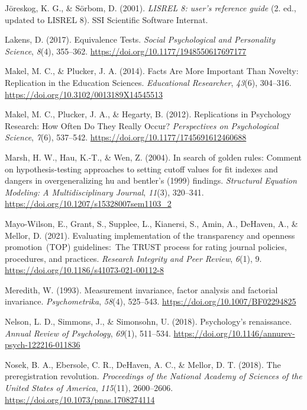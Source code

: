 \documentclass[
  man]{apa7}
\newlength{\cslhangindent}
\newenvironment{CSLReferences}[2] %
 {\begin{list}{}{%
  \setlength{\itemindent}{0pt}
  \setlength{\leftmargin}{0pt}
  \setlength{\parsep}{0pt}
  \ifodd #1
   \setlength{\leftmargin}{\cslhangindent}
   \setlength{\itemindent}{-1\cslhangindent}
  \fi
  \setlength{\itemsep}{#2\baselineskip}}}
 {\end{list}}
\begin{document}
\begin{CSLReferences}{1}{0}
Jöreskog, K. G., \& Sörbom, D. (2001). \emph{LISREL 8: user's reference guide} (2. ed., updated to LISREL 8). SSI Scientific Software Internat.

Lakens, D. (2017). Equivalence Tests. \emph{Social Psychological and Personality Science}, \emph{8}(4), 355--362. \url{https://doi.org/10.1177/1948550617697177}

Makel, M. C., \& Plucker, J. A. (2014). Facts Are More Important Than Novelty: Replication in the Education Sciences. \emph{Educational Researcher}, \emph{43}(6), 304--316. \url{https://doi.org/10.3102/0013189X14545513}

Makel, M. C., Plucker, J. A., \& Hegarty, B. (2012). Replications in Psychology Research: How Often Do They Really Occur? \emph{Perspectives on Psychological Science}, \emph{7}(6), 537--542. \url{https://doi.org/10.1177/1745691612460688}

Marsh, H. W., Hau, K.-T., \& Wen, Z. (2004). In search of golden rules: Comment on hypothesis-testing approaches to setting cutoff values for fit indexes and dangers in overgeneralizing hu and bentler's (1999) findings. \emph{Structural Equation Modeling: A Multidisciplinary Journal}, \emph{11}(3), 320--341. \url{https://doi.org/10.1207/s15328007sem1103_2}

Mayo-Wilson, E., Grant, S., Supplee, L., Kianersi, S., Amin, A., DeHaven, A., \& Mellor, D. (2021). Evaluating implementation of the transparency and openness promotion~(TOP) guidelines:~The TRUST process for rating journal policies, procedures, and practices. \emph{Research Integrity and Peer Review}, \emph{6}(1), 9. \url{https://doi.org/10.1186/s41073-021-00112-8}

Meredith, W. (1993). Measurement invariance, factor analysis and factorial invariance. \emph{Psychometrika}, \emph{58}(4), 525--543. \url{https://doi.org/10.1007/BF02294825}

Nelson, L. D., Simmons, J., \& Simonsohn, U. (2018). Psychology's renaissance. \emph{Annual Review of Psychology}, \emph{69}(1), 511--534. \url{https://doi.org/10.1146/annurev-psych-122216-011836}

Nosek, B. A., Ebersole, C. R., DeHaven, A. C., \& Mellor, D. T. (2018). The preregistration revolution. \emph{Proceedings of the National Academy of Sciences of the United States of America}, \emph{115}(11), 2600--2606. \url{https://doi.org/10.1073/pnas.1708274114}


\end{CSLReferences}
\end{document}

